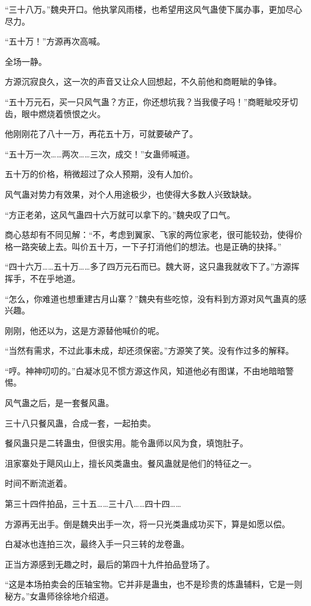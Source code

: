 \begin{this_body}
“三十八万。”魏央开口。他执掌风雨楼，也希望用这风气蛊使下属办事，更加尽心尽力。

“五十万！”方源再次高喊。

全场一静。

方源沉寂良久，这一次的声音又让众人回想起，不久前他和商睚眦的争锋。

“五十万元石，买一只风气蛊？方正，你还想坑我？当我傻子吗！”商睚眦咬牙切齿，眼中燃烧着愤恨之火。

他刚刚花了八十一万，再花五十万，可就要破产了。

“五十万一次……两次……三次，成交！”女蛊师喊道。

五十万的价格，稍微超过了众人预期，没有人加价。

风气蛊对势力有效果，对个人用途极少，也使得大多数人兴致缺缺。

“方正老弟，这风气蛊四十六万就可以拿下的。”魏央叹了口气。

商心慈却有不同见解：“不，考虑到翼家、飞家的两位家老，很可能较劲，使得价格一路突破上去。叫价五十万，一下子打消他们的想法。也是正确的抉择。”

“四十六万……五十万……多了四万元石而已。魏大哥，这只蛊我就收下了。”方源挥挥手，不在乎地道。

“怎么，你难道也想重建古月山寨？”魏央有些吃惊，没有料到方源对风气蛊真的感兴趣。

刚刚，他还以为，这是方源替他喊价的呢。

“当然有需求，不过此事未成，却还须保密。”方源笑了笑。没有作过多的解释。

“哼。神神叨叨的。”白凝冰见不惯方源这作风，知道他必有图谋，不由地暗暗警惕。

风气蛊之后，是一套餐风蛊。

三十八只餐风蛊，合成一套，一起拍卖。

餐风蛊只是二转蛊虫，但很实用。能令蛊师以风为食，填饱肚子。

沮家寨处于飓风山上，擅长风类蛊虫。餐风蛊就是他们的特征之一。

时间不断流逝着。

第三十四件拍品，三十五……三十八……四十四……

方源再无出手。倒是魏央出手一次，将一只光类蛊成功买下，算是如愿以偿。

白凝冰也连拍三次，最终入手一只三转的龙卷蛊。

正当方源感到无趣之时，最后的第四十九件拍品登场了。

“这是本场拍卖会的压轴宝物。它并非是蛊虫，也不是珍贵的炼蛊辅料，它是一则秘方。”女蛊师徐徐地介绍道。


\end{this_body}

